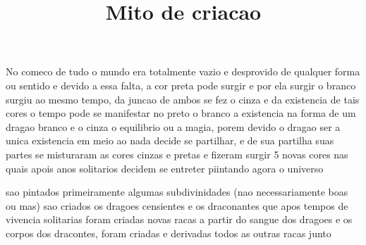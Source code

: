 \documentclass{article}
\title{Mito de criacao}
\begin{document}
\maketitle

No comeco de tudo o mundo era totalmente vazio e desprovido de qualquer forma ou sentido e devido a essa falta, a cor preta pode surgir e por ela surgir o
branco surgiu ao mesmo tempo, da juncao de ambos se fez o cinza e da existencia de tais cores o tempo pode se manifestar no preto o branco a existencia na
forma de um dragao branco e o cinza o equilibrio ou a magia, porem devido o dragao ser a unica existencia em meio ao nada decide se partilhar, e de sua 
partilha suas partes se misturaram as cores cinzas e pretas e fizeram surgir 5 novas cores nas quais apois anos solitarios decidem se entreter piintando agora o universo 

sao pintados primeiramente algumas subdivinidades (nao necessariamente boas ou mas)
sao criados os dragoes censientes
e os draconantes
que apos tempos de vivencia solitarias foram criadas novas racas a partir do sangue dos dragoes e os corpos dos dracontes, foram criadas e derivadas todos as outras racas junto   
\end{document}
